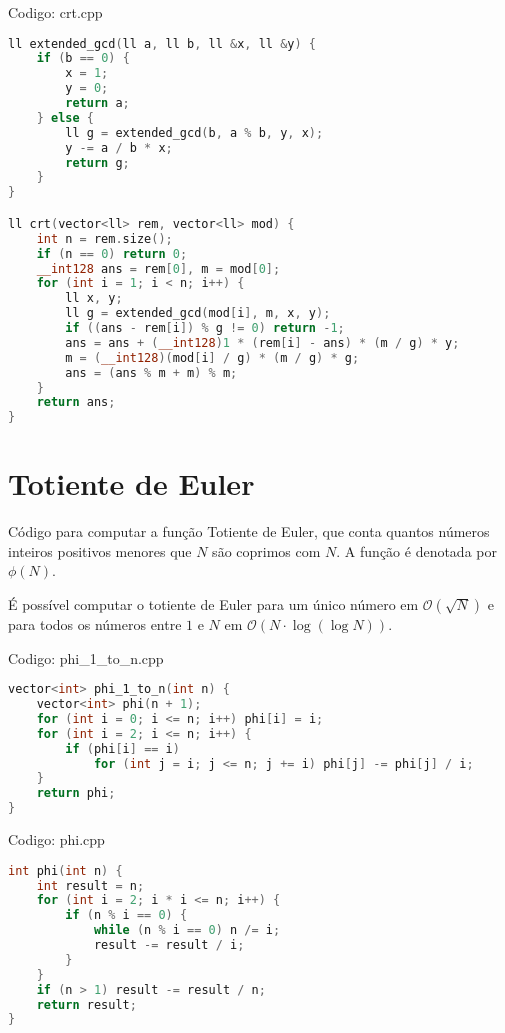 \documentclass[10pt, a4paper, oneside]{book}
\begin{document}
\hfill

Codigo: crt.cpp

\begin{lstlisting}[language=C++]
ll extended_gcd(ll a, ll b, ll &x, ll &y) {
    if (b == 0) {
        x = 1;
        y = 0;
        return a;
    } else {
        ll g = extended_gcd(b, a % b, y, x);
        y -= a / b * x;
        return g;
    }
}

ll crt(vector<ll> rem, vector<ll> mod) {
    int n = rem.size();
    if (n == 0) return 0;
    __int128 ans = rem[0], m = mod[0];
    for (int i = 1; i < n; i++) {
        ll x, y;
        ll g = extended_gcd(mod[i], m, x, y);
        if ((ans - rem[i]) % g != 0) return -1;
        ans = ans + (__int128)1 * (rem[i] - ans) * (m / g) * y;
        m = (__int128)(mod[i] / g) * (m / g) * g;
        ans = (ans % m + m) % m;
    }
    return ans;
}
\end{lstlisting}
\hfill

\section{Totiente de Euler}


Código para computar a  função Totiente de Euler, que conta quantos números inteiros positivos menores que $N$ são coprimos com $N$. A função é denotada por $\phi(N)$.



É possível computar o totiente de Euler para um único número em $\mathcal{O}(\sqrt{N})$ e para todos os números entre $1$ e $N$ em $\mathcal{O}(N \cdot \log (\log N))$.

\hfill

Codigo: phi\_1\_to\_n.cpp

\begin{lstlisting}[language=C++]
vector<int> phi_1_to_n(int n) {
    vector<int> phi(n + 1);
    for (int i = 0; i <= n; i++) phi[i] = i;
    for (int i = 2; i <= n; i++) {
        if (phi[i] == i)
            for (int j = i; j <= n; j += i) phi[j] -= phi[j] / i;
    }
    return phi;
}
\end{lstlisting}
\hfill

Codigo: phi.cpp

\begin{lstlisting}[language=C++]
int phi(int n) {
    int result = n;
    for (int i = 2; i * i <= n; i++) {
        if (n % i == 0) {
            while (n % i == 0) n /= i;
            result -= result / i;
        }
    }
    if (n > 1) result -= result / n;
    return result;
}
\end{lstlisting}
\hfill
\end{document}
